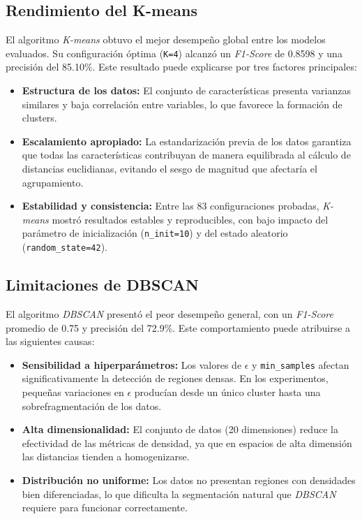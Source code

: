 \documentclass[12pt,a4paper]{article}
\begin{document}
\subsection{Rendimiento del K-means}

El algoritmo \textit{K-means} obtuvo el mejor desempeño global entre los modelos evaluados. 
Su configuración óptima (\texttt{K=4}) alcanzó un \textit{F1-Score} de 0.8598 y una precisión del 85.10\%. 
Este resultado puede explicarse por tres factores principales:

\begin{itemize}
    \item \textbf{Estructura de los datos:} El conjunto de características presenta varianzas similares y baja correlación entre variables, lo que favorece la formación de clusters.
    \item \textbf{Escalamiento apropiado:} La estandarización previa de los datos garantiza que todas las características contribuyan de manera equilibrada al cálculo de distancias euclidianas, evitando el sesgo de magnitud que afectaría el agrupamiento.
    \item \textbf{Estabilidad y consistencia:} Entre las 83 configuraciones probadas, \textit{K-means} mostró resultados estables y reproducibles, con bajo impacto del parámetro de inicialización (\texttt{n\_init=10}) y del estado aleatorio (\texttt{random\_state=42}).
\end{itemize}

\vspace{1em}

\subsection{Limitaciones de DBSCAN}

El algoritmo \textit{DBSCAN} presentó el peor desempeño general, con un \textit{F1-Score} promedio de 0.75 y precisión del 72.9\%. 
Este comportamiento puede atribuirse a las siguientes causas:

\begin{itemize}
    \item \textbf{Sensibilidad a hiperparámetros:} Los valores de $\epsilon$ y \texttt{min\_samples} afectan significativamente la detección de regiones densas. 
    En los experimentos, pequeñas variaciones en $\epsilon$ producían desde un único cluster hasta una sobrefragmentación de los datos.
    \item \textbf{Alta dimensionalidad:} El conjunto de datos (20 dimensiones) reduce la efectividad de las métricas de densidad, ya que en espacios de alta dimensión las distancias tienden a homogenizarse.
    \item \textbf{Distribución no uniforme:} Los datos no presentan regiones con densidades bien diferenciadas, lo que dificulta la segmentación natural que \textit{DBSCAN} requiere para funcionar correctamente.
\end{itemize}
\end{document}
